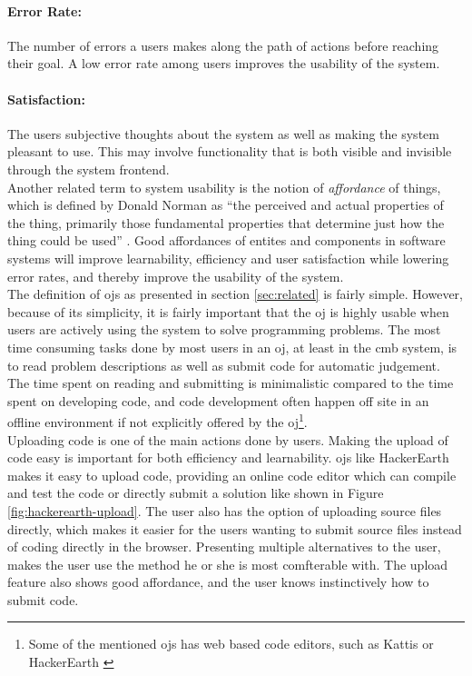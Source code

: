 \paragraph*{Error Rate:} The number of errors a users makes along the path of actions before reaching their goal. A low error rate among users improves the usability of the system.

\paragraph*{Satisfaction:} The users subjective thoughts about the system as well as making the system pleasant to use. This may involve functionality that is both visible and invisible through the system frontend. \\

Another related term to system usability is the notion of \textit{affordance} of things, which is defined by Donald Norman as ``the perceived and actual properties of the thing, primarily those fundamental properties that determine just how the thing could be used'' \cite{norman1988design}. Good affordances of entites and components in software systems will improve learnability, efficiency and user satisfaction while lowering error rates, and thereby improve the usability of the system. \\

The definition of \glspl{oj} as presented in section \ref{sec:related} is fairly simple. However, because of its simplicity, it is fairly important that the \gls{oj} is highly usable when users are actively using the system to solve programming problems. The most time consuming tasks done by most users in an \gls{oj}, at least in the \gls{cmb} system, is to read problem descriptions as well as submit code for automatic judgement. The time spent on reading and submitting is minimalistic compared to the time spent on developing code, and code development often happen off site in an offline environment if not explicitly offered by the \gls{oj}\footnote{Some of the mentioned \glspl{oj} has web based code editors, such as Kattis \cite{KATTIS} or HackerEarth \cite{HACKEREARTH}}. \\

Uploading code is one of the main actions done by users. Making the upload of code easy is important for both efficiency and learnability. \glspl{oj} like HackerEarth makes it easy to upload code, providing an online code editor which can compile and test the code or directly submit a solution like shown in Figure \ref{fig:hackerearth-upload}. The user also has the option of uploading source files directly, which makes it easier for the users wanting to submit source files instead of coding directly in the browser. Presenting multiple alternatives to the user, makes the user use the method he or she is most comfterable with. The upload feature also shows good affordance, and the user knows instinctively how to submit code. \\

